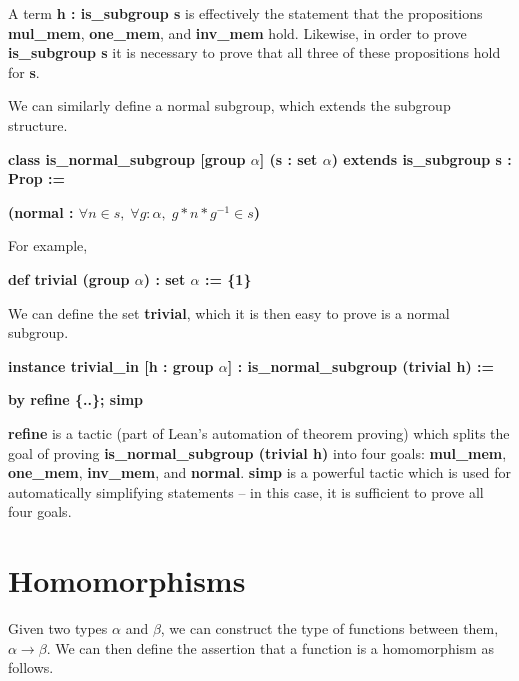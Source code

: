 \documentclass[runningheads,a4paper]{llncs}
\renewcommand{\a}{\alpha}
\renewcommand{\b}{\beta}
\renewcommand{\-}{\setminus}
\begin{document}
A term \textbf{h : is\_subgroup s} is effectively the statement that the propositions \textbf{mul\_mem}, \textbf{one\_mem}, and \textbf{inv\_mem} hold. Likewise, in order to prove \textbf{is\_subgroup s} it is necessary to prove that all three of these propositions hold for \textbf{s}.

We can similarly define a normal subgroup, which extends the subgroup structure.

\vspace{2 mm}
\hspace{2 em}\textbf{class is\_normal\_subgroup [group $\a$] (s : set $\a$) extends is\_subgroup s : Prop :=}

\hspace{4 em}\textbf{(normal : $\forall n \in s,\; \forall g : \a,\; g * n * g^{-1} \in s$)}
\vspace{2 mm}

For example, 

\vspace{2 mm}
\hspace{2 em}\textbf{def trivial (group $\a$) : set $\a$ := \{1\}}
\vspace{2 mm}

We can define the set \textbf{trivial}, which it is then easy to prove is a normal subgroup.

\vspace{2 mm}
\hspace{2 em}\textbf{instance trivial\_in [h : group $\a$] : is\_normal\_subgroup (trivial h) :=}

\hspace{4 em}\textbf{by refine \{..\}; simp}
\vspace{2 mm}

\textbf{refine} is a tactic (part of Lean's automation of theorem proving) which splits the goal of proving \textbf{is\_normal\_subgroup (trivial h)} into four goals: \textbf{mul\_mem}, \textbf{one\_mem}, \textbf{inv\_mem}, and \textbf{normal}. \textbf{simp} is a powerful tactic which is used for automatically simplifying statements -- in this case, it is sufficient to prove all four goals.

\section{Homomorphisms}

Given two types $\a$ and $\b$, we can construct the type of functions between them, $\a \to \b$. We can then define the assertion that a function is a homomorphism as follows.
\end{document}

